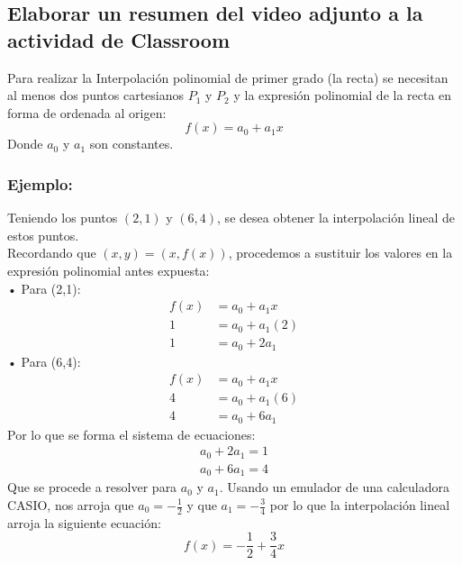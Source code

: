 \documentclass[letterpaper, 12pt]{article}
\begin{document}
\thispagestyle{fancy}
\subsection*{Elaborar un resumen del video adjunto a la actividad de Classroom}
\justify
Para realizar la Interpolación polinomial de primer grado (la recta) se necesitan al menos dos puntos
cartesianos \(P_1\) y \(P_2\) y la expresión polinomial de la recta en forma de ordenada al origen:
{\large \[f(x)=a_0+a_1x\]}
\justify
Donde \(a_0\) y \(a_1\) son constantes.
\subsubsection*{Ejemplo:}
\justify
Teniendo los puntos \((2,1)\) y \((6,4)\), se desea obtener la interpolación lineal de estos puntos.
\\\newline
Recordando que \((x,y)=(x,f(x))\), procedemos a sustituir los valores en la expresión polinomial antes expuesta:
\\\newline
• Para (2,1):
{\large\begin{equation*}
    \begin{aligned}
        f(x)&=a_0+a_1x\\
        1&=a_0+a_1(2)\\
        1&=a_0+2a_1
    \end{aligned}
\end{equation*}}
\justify
• Para (6,4):
{\large\begin{equation*}
    \begin{aligned}
        f(x)&=a_0+a_1x\\
        4&=a_0+a_1(6)\\
        4&=a_0+6a_1
    \end{aligned}
\end{equation*}}
\justify
Por lo que se forma el sistema de ecuaciones:
{\large\begin{equation*}
    \begin{aligned}
        a_0+2a_1=1\\
        a_0+6a_1=4
    \end{aligned}
\end{equation*}}
\justify
Que se procede a resolver para \(a_0\) y \(a_1\). Usando un emulador de una calculadora CASIO, nos arroja que 
\(a_0=-\frac{1}{2}\) y que \(a_1=-\frac{3}{4}\) por lo que la interpolación lineal arroja la siguiente ecuación:
{\large\[f(x)=-\frac{1}{2}+\frac{3}{4}x\]}
\end{document}
